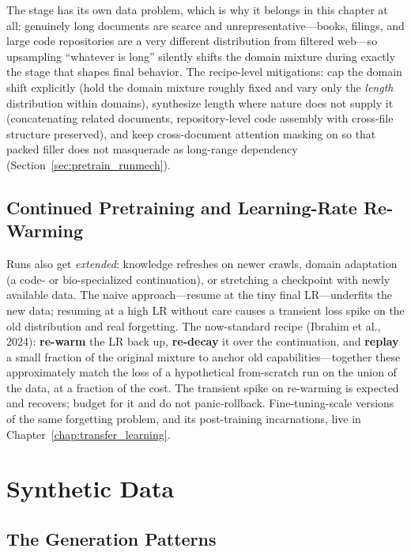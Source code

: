 The stage has its own data problem, which is why it belongs in this chapter at all: genuinely long documents are scarce and unrepresentative---books, filings, and large code repositories are a very different distribution from filtered web---so upsampling ``whatever is long'' silently shifts the domain mixture during exactly the stage that shapes final behavior. The recipe-level mitigations: cap the domain shift explicitly (hold the domain mixture roughly fixed and vary only the \textit{length} distribution within domains), synthesize length where nature does not supply it (concatenating related documents, repository-level code assembly with cross-file structure preserved), and keep cross-document attention masking on so that packed filler does not masquerade as long-range dependency (Section~\ref{sec:pretrain_runmech}).

\subsection{Continued Pretraining and Learning-Rate Re-Warming}

Runs also get \textit{extended}: knowledge refreshes on newer crawls, domain adaptation (a code- or bio-specialized continuation), or stretching a checkpoint with newly available data. The naive approach---resume at the tiny final LR---underfits the new data; resuming at a high LR without care causes a transient loss spike on the old distribution and real forgetting. The now-standard recipe (Ibrahim et al., 2024): \textbf{re-warm} the LR back up, \textbf{re-decay} it over the continuation, and \textbf{replay} a small fraction of the original mixture to anchor old capabilities---together these approximately match the loss of a hypothetical from-scratch run on the union of the data, at a fraction of the cost. The transient spike on re-warming is expected and recovers; budget for it and do not panic-rollback. Fine-tuning-scale versions of the same forgetting problem, and its post-training incarnations, live in Chapter~\ref{chap:transfer_learning}.

\section{Synthetic Data}
\label{sec:pretrain_synthetic}

\subsection{The Generation Patterns}

